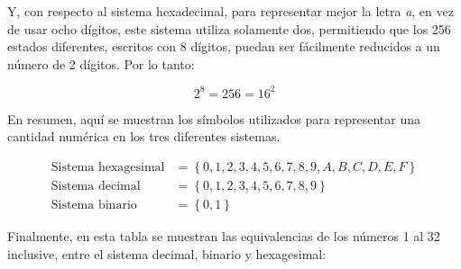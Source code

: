 \documentclass[12pt,a4paper,twoside]{book}
\begin{document}
Y, con respecto al sistema hexadecimal, para representar mejor la letra \textit{a}, en vez de usar ocho dígitos, este sistema utiliza solamente dos, permitiendo que los 256 estados diferentes, escritos con 8 dígitos, puedan ser fácilmente reducidos a un número de 2 dígitos. Por lo tanto:

\[
2^{8}= 256 = 16^2
\]

En resumen, aquí se muestran los símbolos utilizados para representar una cantidad numérica en los tres diferentes sistemas.

\begin{align*}
\text{Sistema hexagesimal} &= \left\lbrace 0, 1, 2, 3, 4, 5, 6, 7, 8, 9, A, B, C, D, E, F \right\rbrace \\
\text{Sistema decimal} &= \left\lbrace 0, 1, 2, 3, 4, 5, 6, 7, 8, 9 \right\rbrace \\
\text{Sistema binario} &= \left\lbrace 0, 1 \right\rbrace
\end{align*}

Finalmente, en esta tabla se muestran las equivalencias de los números 1 al 32 inclusive, entre el sistema decimal, binario y hexagesimal:
\end{document}
